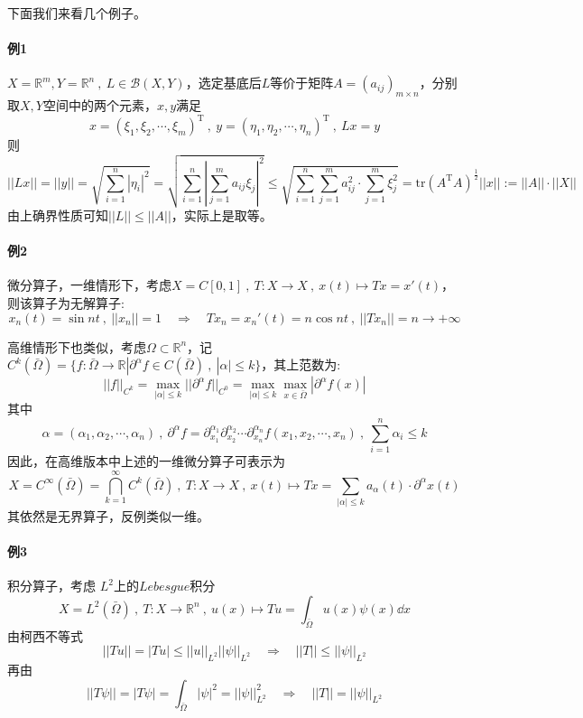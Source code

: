 下面我们来看几个例子。
\paragraph*{例1} \quad $X=\mathbb{R}^m,Y=\mathbb{R}^n \ , \ L \in \mathscr{B}(X,Y)$，选定基底后$L$等价于矩阵$A=(a_{ij})_{m \times n}$，分别取$X,Y$空间中的两个元素，$x,y$满足
\[x=(\xi_1,\xi_2,\cdots,\xi_m)^{\text{T}} \ , \ y=(\eta_1,\eta_2,\cdots,\eta_n)^{\text{T}} \ , \ Lx=y\]
则
\[||Lx||=||y||=\sqrt{\sum_{i=1}^n|\eta_i|^2}=\sqrt{\sum_{i=1}^n\left|\sum_{j=1}^ma_{ij}\xi_j\right|^2} \leq \sqrt{\sum_{i=1}^n\sum_{j=1}^ma_{ij}^2 \cdot \sum_{j=1}^m\xi_j^2}=\text{tr}(A^{\text{T}}A)^{\frac{1}{2}}||x||:=||A||\cdot||X||\]
由上确界性质可知$||L|| \leq ||A||$，实际上是取等。

\paragraph*{例2} \quad 微分算子，一维情形下，考虑$X=C[0,1] \ , \ T:X \to X \ , \ x(t) \mapsto Tx=x'(t)$，则该算子为无解算子:
\[x_n(t)=\sin nt \ , \ ||x_n||=1 \quad \Rightarrow \quad Tx_n=x_n'(t)=n \cos nt \ , \ ||Tx_n||=n \to +\infty\]

高维情形下也类似，考虑$\Omega \subset \mathbb{R}^n$，记$C^k(\bar{\Omega})=\{f:\bar{\Omega} \to \mathbb{R}|\partial^{\alpha}f \in C(\bar{\Omega}) \ , \ |\alpha| \leq k\}$，其上范数为:
\[||f||_{C^k}=\mathop \text{max}\limits_{|\alpha| \leq k}||\partial^{\alpha}f||_{C^0}=\mathop \text{max}\limits_{|\alpha| \leq k}\mathop \text{max}\limits_{x \in \bar{\Omega}}|\partial^{\alpha}f(x)|\]
其中
\[\alpha=(\alpha_1,\alpha_2,\cdots,\alpha_n) \ , \ \partial^{\alpha}f=\partial^{\alpha_1}_{x_1}\partial^{\alpha_2}_{x_2}\cdots\partial^{\alpha_n}_{x_n}f(x_1,x_2,\cdots,x_n) \ , \ \sum_{i=1}^n\alpha_i \leq k\]
因此，在高维版本中上述的一维微分算子可表示为
\[X=C^{\infty}(\bar{\Omega})=\bigcap_{k=1}^{\infty}C^k(\bar{\Omega}) \ , \ T:X \to X \ , \ x(t) \mapsto Tx=\sum_{|\alpha| \leq k}a_{\alpha}(t)\cdot\partial^{\alpha}x(t)\]
其依然是无界算子，反例类似一维。

\paragraph*{例3} \quad 积分算子，考虑 $L^2$上的$Lebesgue$积分
\[X=L^2(\bar{\Omega}) \ , \ T:X \to \mathbb{R}^n \ , \ u(x) \mapsto Tu=\int_{\bar{\Omega}}u(x)\psi(x)\dd x\]
由柯西不等式
\[||Tu||=|Tu| \leq ||u||_{L^2}||\psi||_{L^2} \quad \Rightarrow \quad ||T|| \leq ||\psi||_{L^2}\]
再由
\[||T\psi||=|T\psi|=\int_{\bar{\Omega}}|\psi|^2=||\psi||_{L^2}^2 \quad \Rightarrow \quad ||T||=||\psi||_{L^2}\]

